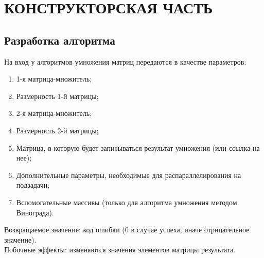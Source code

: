 \documentclass[a4paper,12pt]{article}
\begin{document}

\newpage
\section{КОНСТРУКТОРСКАЯ ЧАСТЬ}

\subsection{Разработка алгоритма}
На вход у алгоритмов умножения матриц передаются в качестве параметров:
\begin{enumerate}
\item 1-я матрица-множитель;
\item Размерность 1-й матрицы;
\item 2-я матрица-множитель;
\item Размерность 2-й матрицы;
\item Матрица, в которую будет записываться результат умножения (или ссылка на нее);
\item Дополнительные параметры, необходимые для распараллелирования на подзадачи;
\item Вспомогательные массивы (только для алгоритма умножения методом Винограда).
\end{enumerate}
Возвращаемое значение: код ошибки (0 в случае успеха, иначе отрицательное значение). \\
Побочные эффекты:
изменяются значения элементов матрицы результата.

\newpage
\end{document}

